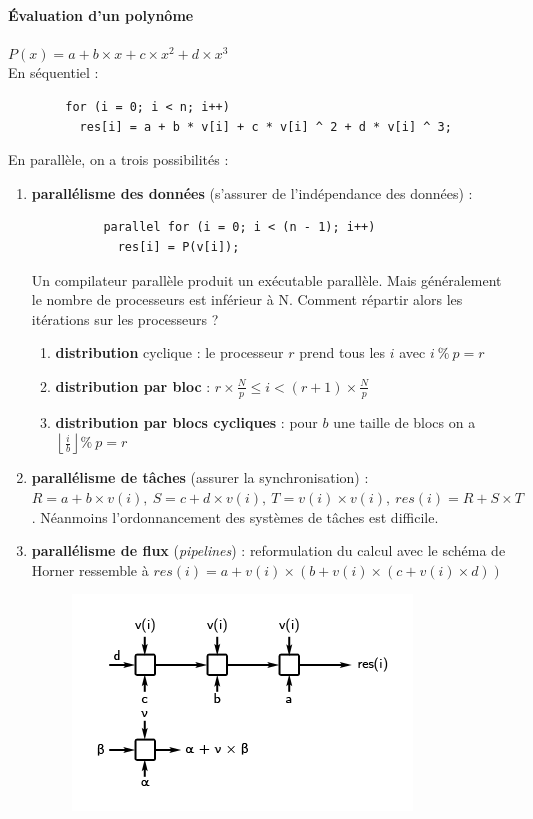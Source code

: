 \documentclass[12pt, a4paper]{article}
\begin{document}
      \paragraph{Évaluation d'un polynôme} \(P(x) = a + b \times x + c \times
      x^2 + d \times x ^ 3\) \\
      En séquentiel :
      \begin{lstlisting}
        for (i = 0; i < n; i++)
          res[i] = a + b * v[i] + c * v[i] ^ 2 + d * v[i] ^ 3;
      \end{lstlisting}
      En parallèle, on a trois possibilités :
      \begin{enumerate}
        \item \textbf{parallélisme des données} (s'assurer de l'indépendance des
         données) :
        \begin{lstlisting}
          parallel for (i = 0; i < (n - 1); i++)
            res[i] = P(v[i]);
        \end{lstlisting}
        Un compilateur parallèle produit un exécutable parallèle. Mais
        généralement le nombre de processeurs est inférieur à N. Comment
        répartir alors les itérations sur les processeurs ?
        \begin{enumerate}
          \item \textbf{distribution} cyclique : le processeur $r$ prend tous
          les $i$ avec $i\ \%\ p = r$
          \item \textbf{distribution par bloc} : $r \times \frac{N}{p} \leq i <
          (r + 1) \times \frac{N}{p}$
          \item \textbf{distribution par blocs cycliques} : pour $b$ une taille
          de blocs on a $\left \lfloor{\frac{i}{b}}\right \rfloor \%\ p = r$
        \end{enumerate}
        \item \textbf{parallélisme de tâches} (assurer la synchronisation) : $R
        = a + b \times v(i),\ S = c + d \times v(i),\ T = v(i) \times v(i),\
        res(i) = R + S \times T$. Néanmoins l'ordonnancement des systèmes de
        tâches est difficile.
        \item \textbf{parallélisme de flux} (\textit{pipelines}) : reformulation
         du calcul avec le schéma de Horner ressemble à $res(i) = a + v(i)
        \times (b + v(i) \times (c + v(i) \times d))$
        \begin{figure}[!ht]
          \centering
          \includegraphics{images/pflux.png}

\end{figure}
\end{enumerate}
\end{document}
